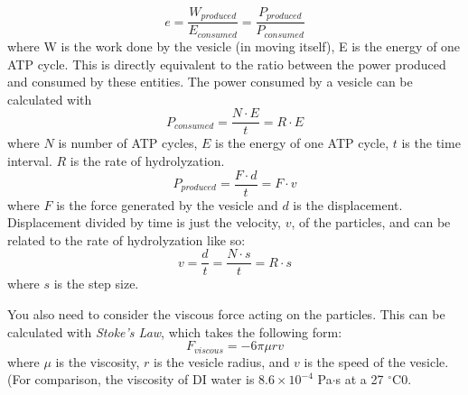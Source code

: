 \begin{equation}
e = \frac{W_{produced}}{E_{consumed}} = \frac{P_{produced}}{P_{consumed}}
\end{equation}
where W is the work done by the vesicle (in moving itself), E is the energy of one ATP cycle.
This is directly equivalent to the ratio between the power produced and consumed by these entities.
The power consumed by a vesicle can be calculated with
\begin{equation}
P_{consumed} = \frac{N \cdot E}{t} = R \cdot E
\end{equation}
where $N$ is number of ATP cycles, $E$ is the energy of one ATP cycle, $t$ is the time interval. $R$ is the rate of hydrolyzation.
\begin{equation}
P_{produced} = \frac{F \cdot d}{t} = F \cdot v
\end{equation}
where $F$ is the force generated by the vesicle and $d$ is the displacement.
Displacement divided by time is just the velocity, $v$, of the particles, and can be related to the rate of hydrolyzation like so:
\begin{equation}
v = \frac{d}{t} = \frac{N \cdot s}{t} = R \cdot s
\end{equation}
where $s$ is the step size.
\par
You also need to consider the viscous force acting on the particles. This can be calculated with \emph{Stoke's Law}, which takes the following form:
\begin{equation}
F_{viscous} = -6 \pi \mu r v
\end{equation}
where $\mu$ is the viscosity, $r$ is the vesicle radius, and $v$ is the speed of the vesicle.
(For comparison, the viscosity of DI water is $8.6 \times 10^{-4}$ Pa$\cdot$s at a 27 $^{\circ}$C0.

